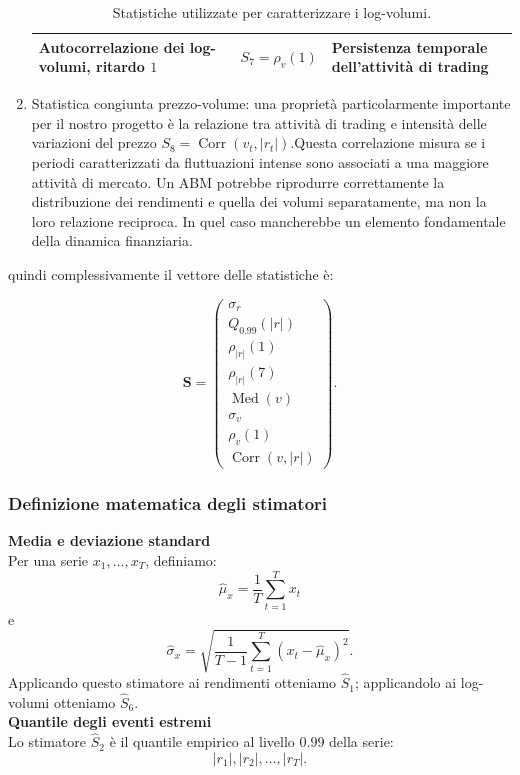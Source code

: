 \begin{enumerate}
\begin{table}[h]
\begin{tabularx}{\textwidth}{X c X}
            Autocorrelazione dei log-volumi, ritardo $1$
            & $S_7 = \rho_v(1)$
            & Persistenza temporale dell'attività di trading \\

            \bottomrule
            \end{tabularx}
            \caption{Statistiche utilizzate per caratterizzare i log-volumi.}
            \label{tab:statistiche-log-volumi}
        \end{table}
    \item Statistica congiunta prezzo-volume: una proprietà particolarmente importante per il nostro progetto è la relazione tra attività di trading e 
    intensità delle variazioni del prezzo $S_8=\operatorname{Corr}(v_t,|r_t|)$.Questa correlazione misura se i periodi caratterizzati da fluttuazioni 
    intense sono associati a una maggiore attività di mercato. Un ABM potrebbe riprodurre correttamente la distribuzione dei rendimenti e quella dei 
    volumi separatamente, ma non la loro relazione reciproca. In quel caso mancherebbe un elemento fondamentale della dinamica finanziaria.
\end{enumerate}

quindi complessivamente il vettore delle statistiche è:

\[
\mathbf S=
\begin{pmatrix}
\sigma_r\\
Q_{0.99}(|r|)\\
\rho_{|r|}(1)\\
\rho_{|r|}(7)\\
\operatorname{Med}(v)\\
\sigma_v\\
\rho_v(1)\\
\operatorname{Corr}(v,|r|)
\end{pmatrix}.
\]

\subsubsection{Definizione matematica degli stimatori}
\textbf{Media e deviazione standard}\\
Per una serie \(x_1,\ldots,x_T\), definiamo:
\[
\widehat\mu_x=\frac{1}{T}\sum_{t=1}^{T}x_t
\]
e
\[
\widehat\sigma_x=
\sqrt{\frac{1}{T-1}\sum_{t=1}^{T}(x_t-\widehat\mu_x)^2}.
\]
Applicando questo stimatore ai rendimenti otteniamo \(\widehat S_1\); applicandolo ai log-volumi otteniamo \(\widehat S_6\).\\
\textbf{Quantile degli eventi estremi}\\
Lo stimatore \(\widehat S_2\) è il quantile empirico al livello \(0.99\) della serie:
\[
|r_1|,|r_2|,\ldots,|r_T|.
\]

